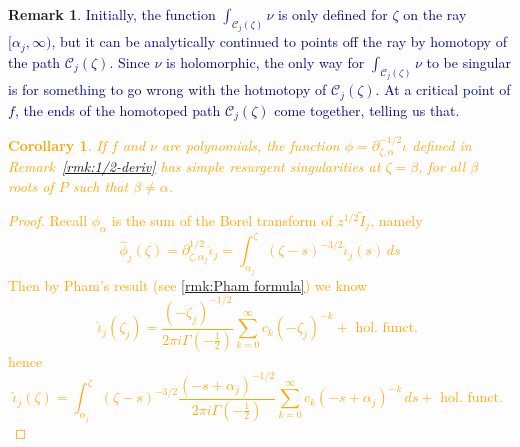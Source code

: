 \documentclass{article}
\newcommand{\fracderiv}[3]{\partial^{#1}_{#2, #3}}
\theoremstyle{definition}
\newtheorem{remark}[definition]{Remark}
\theoremstyle{plain}
\newtheorem{corollary}[theorem]{Corollary}
\begin{document}
\begin{remark}
\textcolor{Navy}{Initially, the function $\int_{\mathcal{C}_j(\zeta)} \nu$ is only defined for $\zeta$ on the ray $[\alpha_j, \infty)$, but it can be analytically continued to points off the ray by homotopy of the path $\mathcal{C}_j(\zeta)$. Since $\nu$ is holomorphic, the only way for $\int_{\mathcal{C}_j(\zeta)} \nu$ to be singular is for something to go wrong with the hotmotopy of $\mathcal{C}_j(\zeta)$. At a critical point of $f$, the ends of the homotoped path $\mathcal{C}_j(\zeta)$ come together, telling us that.}
\end{remark}
\textcolor{orange}{
\begin{corollary}\label{simple-res-thimble}
    If $f$ and $\nu$ are polynomials, the function ${\phi}=\fracderiv{-1/2}{\zeta}{\alpha}\iota$ defined in Remark~\ref{rmk:1/2-deriv} has simple resurgent singularities at $\zeta=\beta$, for all $\beta$ roots of $P$ such that $\beta\neq\alpha$.  
\end{corollary}
\begin{proof}
    Recall ${\phi}_\alpha$ is the sum of the Borel transform of $z^{1/2}\tilde{I}_j$, namely 
    \[\hat{\phi}_j(\zeta)=\fracderiv{1/2}{\zeta}{\alpha_j}\hat{\iota}_j=\int_{\alpha_j}^\zeta(\zeta-s)^{-3/2}\hat{\iota}_j(s)\, ds\]
    Then by Pham's result (see \eqref{rmk:Pham formula}) we know 
    \[\hat{\iota}_j(\zeta_j)=\frac{(-\zeta_j)^{-1/2}}{2\pi i\Gamma(-\tfrac{1}{2})}\sum_{k=0}^\infty c_k (-\zeta_j)^{-k} + \text{ hol. funct. }\]
hence 
\[\hat{\iota}_j(\zeta)=\int_{\alpha_j}^\zeta(\zeta-s)^{-3/2}\frac{(-s+\alpha_j)^{-1/2}}{2\pi i\Gamma(-\tfrac{1}{2})}\sum_{k=0}^\infty c_k (-s+\alpha_j)^{-k} \, ds + \text{ hol. funct. }\]
\end{proof}
}
\end{document}
